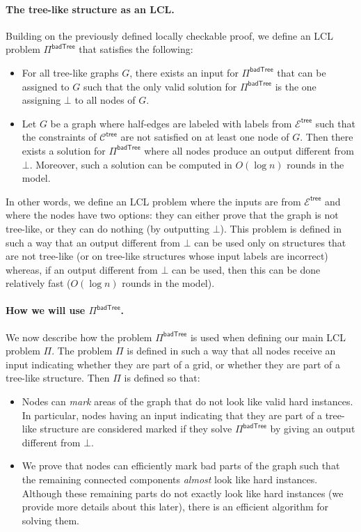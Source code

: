 \documentclass[11pt]{article}
\newcommand{\ltreelike}{\mathsf {tree}}
\newcommand{\lbadtree}{\mathsf {badTree}}
\begin{document}
\paragraph{The tree-like structure as an LCL.}
Building on the previously defined locally checkable proof, we define an LCL problem $\Pi^{\lbadtree}$ that satisfies the following:
\begin{itemize}
	\item For all tree-like graphs $G$, there exists an input for $\Pi^{\lbadtree}$ that can be assigned to $G$ such that the only valid solution for $\Pi^{\lbadtree}$ is the one assigning $\bot$ to all nodes of $G$.
	\item Let $G$ be a graph where half-edges are labeled with labels from $\mathcal{E}^{\ltreelike}$ such that the constraints of $\mathcal{C}^{\ltreelike}$ are not satisfied on at least one node of $G$. Then there exists a solution for $\Pi^{\lbadtree}$ where all nodes produce an output different from $\bot$. Moreover, such a solution can be computed in $O(\log n)$ rounds in the \local model. 
\end{itemize}
In other words, we define an LCL problem where the inputs are from
$\mathcal{E}^{\ltreelike}$ and where the nodes have two options: they can either
prove that the graph is not tree-like, or they can do nothing (by outputting
$\bot$). This problem is defined in such a way that an output different from
$\bot$ can be used only on structures that are not tree-like (or on tree-like
structures whose input labels are incorrect) whereas, if an output different
from $\bot$ can be used, then this can be done relatively fast ($O(\log
n)$ rounds in the \local model).

\paragraph{\boldmath How we will use $\Pi^{\lbadtree}$.}
We now describe how the problem $\Pi^{\lbadtree}$ is used when defining our main
LCL problem $\Pi$. The problem $\Pi$ is defined in such a way that all nodes
receive an input indicating whether they are part of a grid, or whether they are
part of a tree-like structure. Then $\Pi$ is defined so that:
\begin{itemize}
	\item Nodes can \emph{mark} areas of the graph that do not look like valid hard instances. In particular, nodes having an input indicating that they are part of a tree-like structure are considered marked if they solve $\Pi^{\lbadtree}$ by giving an output different from $\bot$.
	\item We prove that nodes can efficiently mark bad parts of the graph
	such that the remaining connected components \emph{almost} look like hard
	instances. Although these remaining parts do not exactly look like hard
	instances (we provide more details about this later), there is an efficient
	algorithm for solving them.
\end{itemize} 
\end{document}
